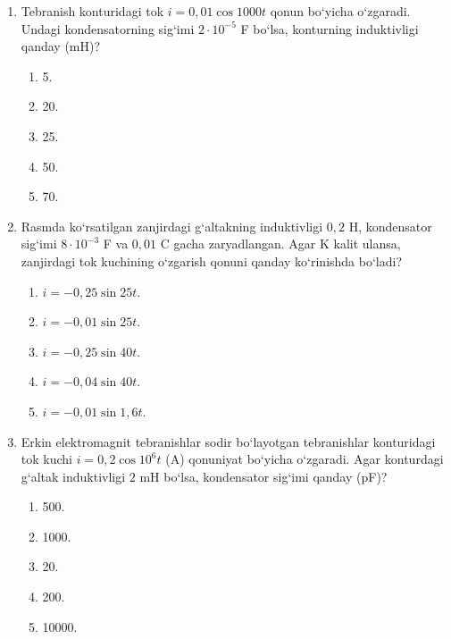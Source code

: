 \begin{enumerate}
\item Tebranish konturidagi tok $i=0,01\cos1000t$ qonun bo‘yicha o‘zgaradi. Undagi kondensatorning sig‘imi $2\cdot10^{-5}$ F bo‘lsa, konturning induktivligi qanday (mH)?
\begin{enumerate}[label=\Alph*)]
\item 5.
\item 20.
\item 25.
\item 50.
\item 70.
\end{enumerate}

\item Rasmda ko‘rsatilgan zanjirdagi g‘altakning induktivligi $0,2$ H, kondensator sig‘imi $8\cdot10^{-3}$ F va $0,01$ C gacha zaryadlangan. Agar K kalit ulansa, zanjirdagi tok kuchining o‘zgarish qonuni qanday ko‘rinishda bo‘ladi?


\begin{enumerate}[label=\Alph*)]
\item $i=-0,25\sin25t$.
\item $i=-0,01\sin25t$.
\item $i=-0,25\sin40t$.
\item $i=-0,04\sin40t$.
\item $i=-0,01\sin1,6t$.
\end{enumerate}

\item Erkin elektromagnit tebranishlar sodir bo‘layotgan tebranishlar konturidagi tok kuchi $i=0,2\cos10^6 t$ (A) qonuniyat bo‘yicha o‘zgaradi. Agar konturdagi g‘altak induktivligi $2$ mH bo‘lsa, kondensator sig‘imi qanday (pF)?
\begin{enumerate}[label=\Alph*)]
\item 500.
\item 1000.
\item 20.
\item 200.
\item 10000.
\end{enumerate}

\end{enumerate}

